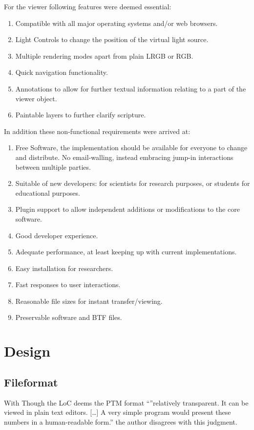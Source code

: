 For the viewer following features were deemed essential:
\begin{enumerate}[resume]
\item Compatible with all major operating systems and/or web browsers.\label{req_system}
\item Light Controls to change the position of the virtual light source.
\item Multiple rendering modes apart from plain LRGB or RGB.
\item Quick navigation functionality.
\item Annotations to allow for further textual information relating to a part of
  the viewer object.
\item Paintable layers to further clarify scripture.
\end{enumerate}

In addition these non-functional requirements were arrived at:
\begin{enumerate}[resume]
\item  Free Software, the implementation should be available for everyone to
  change and distribute. No email-walling, instead embracing jump-in
  interactions between multiple parties. \label{req_os}
\item Suitable of new developers: for scientists for research purposes,
  or students for educational purposes. \label{req_easy}
\item Plugin support to allow independent additions or modifications to the core software.
\item Good developer experience. \label{req_dx}
\item Adequate performance, at least keeping up with current
  implementations. \label{req_performance}
\item Easy installation for
  researchers. \label{req_install}
\item Fast responses to user interactions. \label{req_react}
\item Reasonable file sizes for instant transfer/viewing.
\item Preservable software and BTF files.\label{req_preserve}
\end{enumerate}

\section{Design}

\subsection{Fileformat}
With
Though the LoC deems the PTM format ``''relatively transparent. It can be viewed
in plain text editors. [\ldots] A very simple program would present these
numbers in a human-readable
form.''\cite*{library_of_congress_polynomial_2018} the author disagrees with
this judgment.

